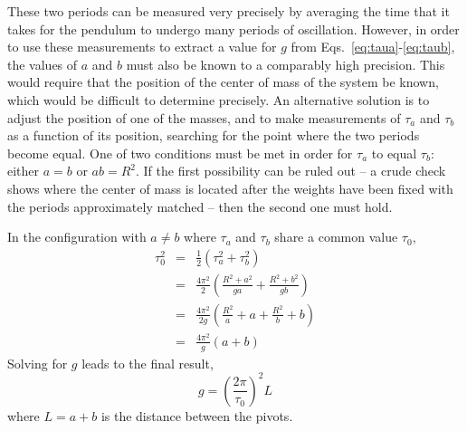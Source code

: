 \documentclass{revtex4}
\begin{document}
These two periods can be measured very precisely by averaging the time
that it takes for the pendulum to undergo many periods of oscillation.
However, in order to use these measurements to extract a value for $g$
from Eqs.~\ref{eq:taua}-\ref{eq:taub}, the values of $a$ and $b$ must also
be known to a comparably high precision.  This would require that the 
position of the center of mass of the system be known, which would be
difficult to determine precisely.  An alternative solution is to adjust
the position of one of the masses, and to make measurements of $\tau_a$
and $\tau_b$ as a function of its position, searching for the point where
the two periods become equal.  One of two conditions must be met in order
for $\tau_a$ to equal $\tau_b$: either $a=b$ or $ab = R^2$.  If the first
possibility can be ruled out -- a crude check shows where the center of mass
is located after the weights have been fixed with the periods approximately
matched -- then the second one must hold.
 
In the configuration with $a\neq b$ where $\tau_a$ and $\tau_b$ share
a common value $\tau_0$,
\begin{eqnarray}
\tau_0^2 &=& \frac{1}{2}(\tau_a^2 + \tau_b^2) \nonumber \\
         &=& \frac{4\pi^2}{2}\left(\frac{R^2+a^2}{ga}+\frac{R^2+b^2}{gb}\right)
                                              \nonumber \\
         &=& \frac{4\pi^2}{2g}\left(\frac{R^2}{a}+a+\frac{R^2}{b}+b\right)
                                              \nonumber \\
         &=& \frac{4\pi^2}{g}\left(a+b\right) 
\end{eqnarray}
Solving for $g$ leads to the final result,
\begin{equation}
g = \left(\frac{2\pi}{\tau_0}\right)^2 L 
\end{equation}
where $L = a+b$ is the distance between the pivots.
\end{document}
